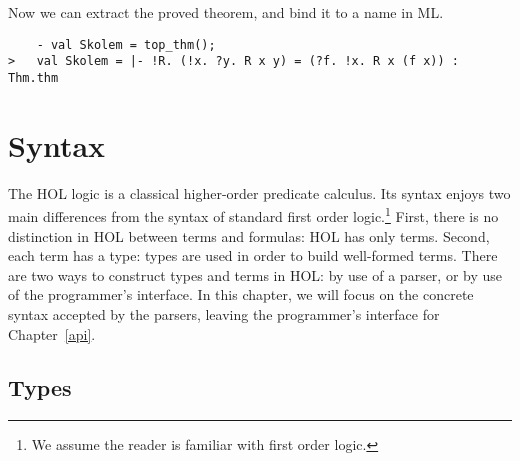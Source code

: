 \documentclass[12pt,fleqn,layout,a4paper]{report}
\begin{document}
Now we can extract the proved theorem, and
bind it to a name in ML.
\begin{verbatim}
    - val Skolem = top_thm();
>   val Skolem = |- !R. (!x. ?y. R x y) = (?f. !x. R x (f x)) : Thm.thm
\end{verbatim}


 \chapter{Syntax}

 The HOL logic is a classical higher-order predicate calculus. Its
 syntax enjoys two main differences from the syntax of standard first
 order logic.\footnote{We assume the reader is familiar with first
   order logic.}  First, there is no distinction in HOL between terms
 and formulas: HOL has only terms. Second, each term has a type: types
 are used in order to build well-formed terms. There are two ways to
 construct types and terms in HOL: by use of a parser, or by use of
 the programmer's interface. In this chapter, we will focus on the
 concrete syntax accepted by the parsers, leaving the programmer's
 interface for Chapter~\ref{api}.


 \section{Types}
\end{document}
